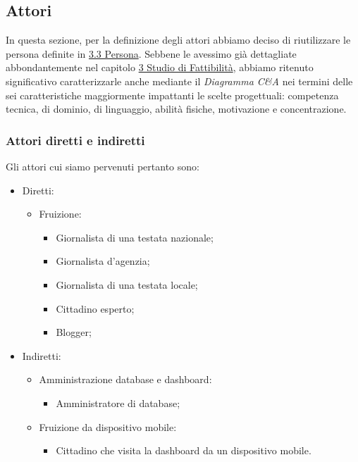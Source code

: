\subsection{Attori}
\label{ss:attori}
In questa sezione, per la definizione degli attori abbiamo deciso di riutilizzare le persona definite in \hyperref[s:persona]{3.3 Persona}.
Sebbene le avessimo già dettagliate abbondantemente nel capitolo \hyperref[c:studio-fattibilita]{3 Studio di Fattibilità}, abbiamo ritenuto significativo caratterizzarle anche mediante il \textit{Diagramma C\&A} nei termini delle sei caratteristiche maggiormente impattanti le scelte progettuali: competenza tecnica, di dominio, di linguaggio, abilità fisiche, motivazione e concentrazione.

\noindent
\subsubsection{Attori diretti e indiretti}
\label{sss:attori-diretti-indiretti}
Gli attori cui siamo pervenuti pertanto sono:
\begin{itemize}
    \item Diretti:
    \begin{itemize}
        \item Fruizione:
        \begin{itemize}
            \item Giornalista di una testata nazionale;
            \item Giornalista d'agenzia;
            \item Giornalista di una testata locale;
            \item Cittadino esperto;
            \item Blogger;
        \end{itemize}
    \end{itemize}
    \item Indiretti:
    \begin{itemize}
        \item Amministrazione database e dashboard:
        \begin{itemize}
            \item Amministratore di database;
        \end{itemize}
        \item Fruizione da dispositivo mobile:
        \begin{itemize}
            \item Cittadino che visita la dashboard da un dispositivo mobile.
        \end{itemize}
    \end{itemize}
\end{itemize}

